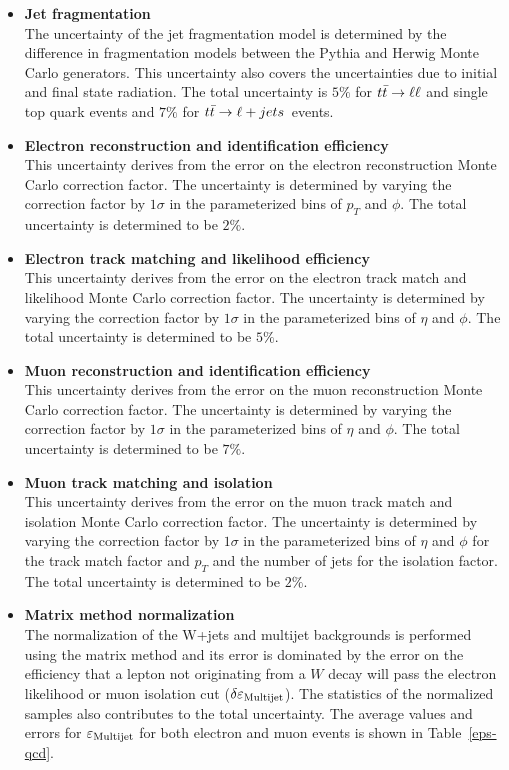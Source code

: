 \begin{itemize}
\item {\bf Jet fragmentation} \\
The uncertainty of the jet fragmentation model is determined by the difference in fragmentation models between the Pythia and Herwig Monte Carlo generators. This uncertainty also covers the uncertainties due to initial and final state radiation. The total uncertainty is $5\%$ for $\mbox{$t\bar{t}$} \rightarrow \ell \ell$ and single top quark events and $7\%$ for $\mbox{$t\bar{t}$} \rightarrow \ell + jets$~events.

\item {\bf Electron reconstruction and identification efficiency} \\
This uncertainty derives from the error on the electron reconstruction Monte Carlo correction factor. The uncertainty is determined by varying the correction factor by $1\sigma$ in the parameterized bins of $p_{T}$ and $\phi$. The total uncertainty is determined to be $2\%$.

\item {\bf Electron track matching and likelihood efficiency} \\
This uncertainty derives from the error on the electron track match and likelihood Monte Carlo correction factor. The uncertainty is determined by varying the correction factor by $1\sigma$ in the parameterized bins of $\eta$ and $\phi$. The total uncertainty is determined to be $5\%$.

\item {\bf Muon reconstruction and identification efficiency} \\
This uncertainty derives from the error on the muon reconstruction Monte Carlo correction factor. The uncertainty is determined by varying the correction factor by $1\sigma$ in the parameterized bins of $\eta$ and $\phi$. The total uncertainty is determined to be $7\%$.

\item {\bf Muon track matching and isolation} \\
This uncertainty derives from the error on the muon track match and isolation Monte Carlo correction factor. The uncertainty is determined by varying the correction factor by $1\sigma$ in the parameterized bins of $\eta$ and $\phi$ for the track match factor and $p_{T}$ and the number of jets for the isolation factor. The total uncertainty is determined to be $2\%$.

\item {\bf Matrix method normalization} \\
The normalization of the W+jets and multijet backgrounds is performed using the matrix method and its error is dominated by the error on the efficiency that a lepton not originating from a $W$ decay will pass the electron likelihood or muon isolation cut ($\delta\varepsilon_{\rm{Multijet}}$). The statistics of the normalized samples also contributes to the total uncertainty. The average values and errors for $\varepsilon_{\rm{Multijet}}$ for both electron and muon events is shown in Table~\ref{eps-qcd}.


\end{itemize}
